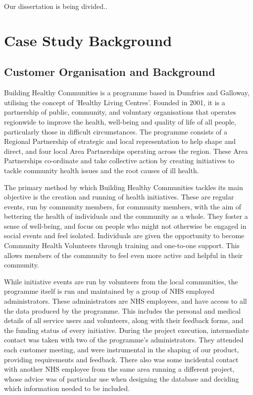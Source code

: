 \documentclass{l3proj}
\begin{document}
Our dissertation is being divided..

\section{Case Study Background}

\subsection{Customer Organisation and Background}
\label{customer}

Building Healthy Communities is a programme based in Dumfries and Galloway, utilising the concept of 'Healthy Living Centres'. Founded in 2001, it is a partnership of public, community, and voluntary organisations that operates regionwide to improve the health, well-being and quality of life of all people, particularly those in difficult circumstances. The programme consists of a Regional Partnership of strategic and local representation to help shape and direct, and four local Area Partnerships operating across the region. These Area Partnerships co-ordinate and take collective action by creating initiatives to tackle community health issues and the root causes of ill health.

The primary method by which Building Healthy Communities tackles its main objective is the creation and running of health initiatives. These are regular events, run by community members, for community members, with the aim of bettering the health of individuals and the community as a whole. They foster a sense of well-being, and focus on people who might not otherwise be engaged in social events and feel isolated. Individuals are given the opportunity to become Community Health Volunteers through training and one-to-one support. This allows members of the community to feel even more active and helpful in their community.

While initiative events are run by volunteers from the local communities, the programme itself is run and maintained by a group of NHS employed administrators. These administrators are NHS employees, and have access to all the data produced by the programme. This includes the personal and medical details of all service users and volunteers, along with their feedback forms, and the funding status of every initiative. During the project execution, intermediate contact was taken with two of the programme's administrators. They attended each customer meeting, and were instrumental in the shaping of our product, providing requirements and feedback. There also was some incidental contact with another NHS employee from the same area running a different project, whose advice was of particular use when designing the database and deciding which information needed to be included.
\end{document}
